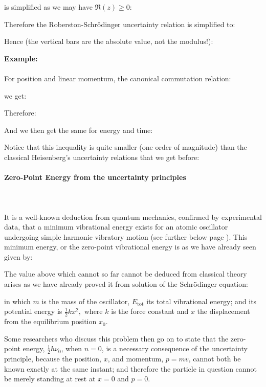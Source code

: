 	is simplified as we may have $\Re(z)\geq 0$:
	
	Therefore the Roberston-Schrödinger uncertainty relation is simplified to:
	
	Hence (the vertical bars are the absolute value, not the modulus!):
	
	\begin{tcolorbox}[colframe=black,colback=white,sharp corners]
	\textbf{{\Large {}}Example:}\\\\
	For position and linear momentum, the canonical commutation relation:
	
	we get:
	
	Therefore:
	
	And we then get the same for energy and time:
	
	Notice that this inequality is quite smaller (one order of magnitude) than the classical Heisenberg's uncertainty relations that we get before:
	
	\end{tcolorbox}
	
	\paragraph{Zero-Point Energy from the uncertainty principles}\label{zero-point energy from the uncertainty principle}\mbox{}\\\\
	It is a well-known deduction from quantum mechanics, confirmed by experimental data, that a minimum vibrational energy exists for an atomic oscillator undergoing simple harmonic vibratory motion (see further below page \pageref{quantum harmonic oscillator}). This minimum energy, or the zero-point vibrational energy is as we have already seen given by:
	
	The value above which cannot so far cannot be deduced from classical theory arises as we have already proved it from solution of the Schrödinger equation:
	
	in which $m$ is the mass of the oscillator, $E_{\text{tot}}$ its total vibrational energy; and its potential energy is $\tfrac{1}{2} k x^{2},$ where $k$ is the force constant and $x$ the displacement from the equilibrium position $x_{0}$.
	
	Some researchers who discuss this problem then go on to state that the zero-point energy, $\tfrac{1}{2}h\nu_0$, when $n=0$, is a necessary consequence of the uncertainty principle, because the position, $x$, and momentum, $p=m v$, cannot both be known exactly at the same instant; and therefore the particle in question cannot be merely standing at rest at $x=0$ and $p=0$.
	

